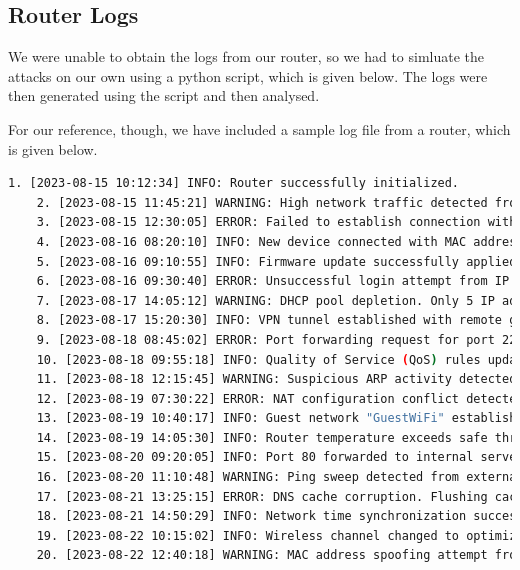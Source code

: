 \documentclass[11pt]{article}
\begin{document}
\subsection{Router Logs}

We were unable to obtain the logs from our router, so we had to simluate the attacks on our own using a python script, which is given below. The logs were then generated using the script and then analysed.

For our reference, though, we have included a sample log file from a router, which is given below.

\begin{lstlisting}[language=bash, caption=Sample Router Log File]
    1. [2023-08-15 10:12:34] INFO: Router successfully initialized.
    2. [2023-08-15 11:45:21] WARNING: High network traffic detected from IP 192.168.1.15.
    3. [2023-08-15 12:30:05] ERROR: Failed to establish connection with DNS server 8.8.8.8.
    4. [2023-08-16 08:20:10] INFO: New device connected with MAC address 00:1A:2B:3C:4D:5E.
    5. [2023-08-16 09:10:55] INFO: Firmware update successfully applied.
    6. [2023-08-16 09:30:40] ERROR: Unsuccessful login attempt from IP 192.168.1.25.
    7. [2023-08-17 14:05:12] WARNING: DHCP pool depletion. Only 5 IP addresses left.
    8. [2023-08-17 15:20:30] INFO: VPN tunnel established with remote gateway 203.0.113.50.
    9. [2023-08-18 08:45:02] ERROR: Port forwarding request for port 22 already exists.
    10. [2023-08-18 09:55:18] INFO: Quality of Service (QoS) rules updated for improved VoIP performance.
    11. [2023-08-18 12:15:45] WARNING: Suspicious ARP activity detected from IP 192.168.1.10.
    12. [2023-08-19 07:30:22] ERROR: NAT configuration conflict detected in rule set.
    13. [2023-08-19 10:40:17] INFO: Guest network "GuestWiFi" established with password authentication.
    14. [2023-08-19 14:05:30] INFO: Router temperature exceeds safe threshold. Cooling initiated.
    15. [2023-08-20 09:20:05] INFO: Port 80 forwarded to internal server at IP 192.168.1.50.
    16. [2023-08-20 11:10:48] WARNING: Ping sweep detected from external IP 123.456.789.10.
    17. [2023-08-21 13:25:15] ERROR: DNS cache corruption. Flushing cache for resolution.
    18. [2023-08-21 14:50:29] INFO: Network time synchronization successful with NTP server.
    19. [2023-08-22 10:15:02] INFO: Wireless channel changed to optimize signal quality.
    20. [2023-08-22 12:40:18] WARNING: MAC address spoofing attempt from device with MAC 11:22:33:44:55:66.
\end{lstlisting}
\end{document}
